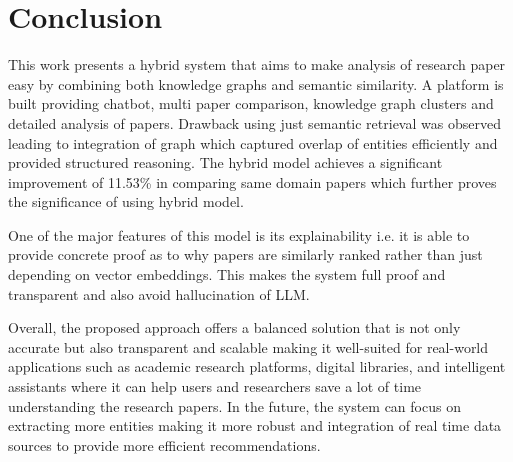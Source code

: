 \documentclass[10pt]{article}
\begin{document}
\section{Conclusion}
This work presents a hybrid system that aims to make analysis of research paper easy by combining both knowledge graphs and semantic similarity. A platform is built providing chatbot, multi paper comparison, knowledge graph clusters and detailed analysis of papers. Drawback using just semantic retrieval was observed leading to integration of graph which captured overlap of entities efficiently and provided structured reasoning. The hybrid model achieves a significant improvement of 11.53\% in comparing same domain papers which further proves the significance of using hybrid model.

One of the major features of this model is its explainability i.e. it is able to provide concrete proof as to why papers are similarly ranked rather than just depending on vector embeddings. This makes the system full proof and transparent and also avoid hallucination of LLM.

Overall, the proposed approach offers a balanced solution that is not only accurate but also transparent and scalable making it well-suited for real-world applications such as academic research platforms, digital libraries, and intelligent assistants where it can help users and researchers save a lot of time understanding the research papers. In the future, the system can focus on extracting more entities making it more robust and integration of real time data sources to provide more efficient recommendations.
\end{document}
